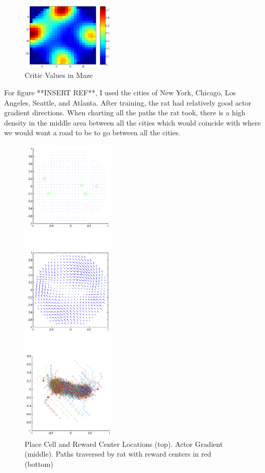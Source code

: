 \documentclass[conference]{IEEEtran}
\begin{document}
\begin{figure}
\includegraphics[width=0.4\textwidth]{waterMazeRevised2_Critic.png} 
\caption{Critic Values in Maze}
\end{figure}

For figure **INSERT REF**, I used the cities of New York, Chicago, Los Angeles, Seattle, and Atlanta. After training, the rat had relatively good actor gradient directions. When charting all the paths the rat took, there is a high density in the middle area between all the cities which would coincide with where we would want a road to be to go between all the cities. 

\begin{figure}
\includegraphics[width=0.4\textwidth]{waterMazeRevisedD_Figure.png} 
\caption{Place Cell and Reward Center Locations (top). Actor Gradient (middle). Paths traversed by rat with reward centers in red (bottom)}
\end{figure}
\end{document}
